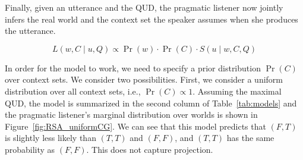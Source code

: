 Finally, given an utterance and the QUD, the pragmatic listener now jointly infers 
 the real world and the context set the speaker assumes when she produces the utterance. 

\begin{equation}
L(w, C \mid u, Q) \propto \Pr(w) \cdot \Pr(C) \cdot S(u \mid w, C, Q)
\end{equation}

In order for the model to work, we need to specify a prior distribution $\Pr(C)$ 
 over context sets.
We consider two possibilities. 
First, we consider a uniform distribution over all context sets, i.e., 
 $\Pr(C)\propto 1$.
Assuming the maximal QUD, the model is summarized in the second column of 
 Table~\ref{tab:models} and the pragmatic listener's marginal distribution over 
 worlds is shown in Figure~\ref{fig:RSA_uniformCG}.
We can see that this model predicts that $(F, T)$ is slightly 
 less likely than $(T, T)$ and $(F, F)$, 
 and $(T, T)$ has the same probability as $(F, F)$. 
This does not capture projection.


